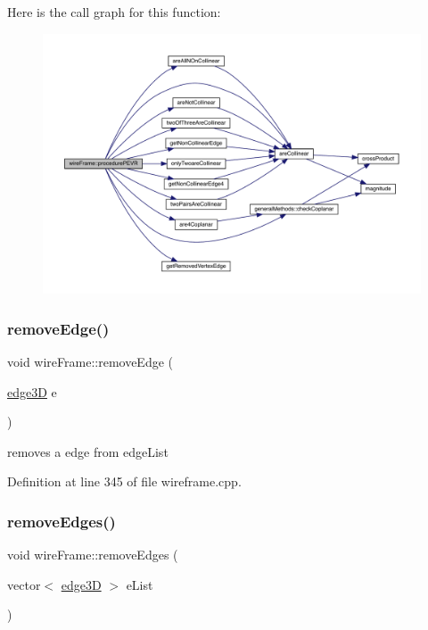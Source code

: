 Here is the call graph for this function\+:
\nopagebreak
\begin{figure}[H]
\begin{center}
\leavevmode
\includegraphics[width=350pt]{classwire_frame_a3799d04d265a08d30e06d5d18facd04d_cgraph}
\end{center}
\end{figure}
\mbox{\label{classwire_frame_ada138a38cdece351080b0967605bd0ca}} 
\subsubsection{\texorpdfstring{remove\+Edge()}{removeEdge()}}
{\footnotesize\ttfamily void wire\+Frame\+::remove\+Edge (\begin{DoxyParamCaption}\item[{\mbox{\hyperlink{structedge3_d}{edge3D}}}]{e }\end{DoxyParamCaption})}

removes a edge from edge\+List

Definition at line 345 of file wireframe.\+cpp.

\mbox{\label{classwire_frame_ad1410339bc0716c4d2ca39f331923b42}} 
\subsubsection{\texorpdfstring{remove\+Edges()}{removeEdges()}}
{\footnotesize\ttfamily void wire\+Frame\+::remove\+Edges (\begin{DoxyParamCaption}\item[{vector$<$ \mbox{\hyperlink{structedge3_d}{edge3D}} $>$}]{e\+List }\end{DoxyParamCaption})}

